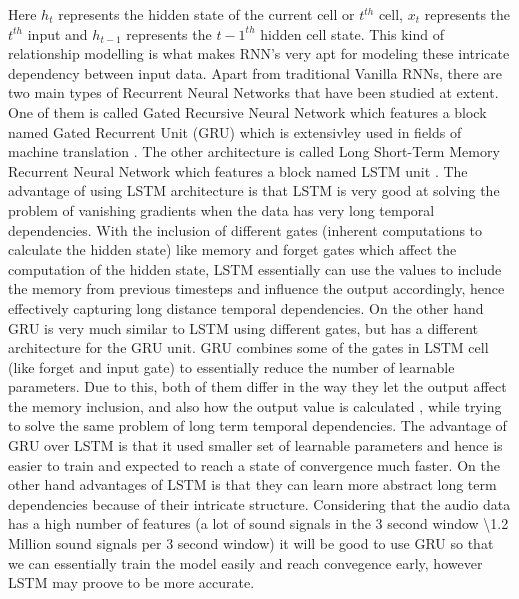 \documentclass[11pt]{article}
\begin{document}
Here $h_t$ represents the hidden state of the current cell or $t^{th}$ cell, $x_t$ represents the $t^{th}$ input and $h_{t-1}$ represents the ${t-1}^{th}$ hidden cell state. This kind of relationship modelling is what makes RNN's very apt for modeling these intricate dependency between input data. Apart from traditional Vanilla RNNs, there are two main types of Recurrent Neural Networks that have been studied at extent. One of them is called Gated Recursive Neural Network which features a block named Gated Recurrent Unit (GRU) which is extensivley used in fields of machine translation \cite{cho2014properties}. The other architecture is called Long Short-Term Memory Recurrent Neural Network which features a block named LSTM unit \cite{graves2013generating}. The advantage of using LSTM architecture is that LSTM is very good at solving the problem of vanishing gradients when the data has very long temporal dependencies. With the inclusion of different gates (inherent computations to calculate the hidden state) like memory and forget gates which affect the computation of the hidden state, LSTM essentially can use the values to include the memory from previous timesteps and influence the output accordingly, hence effectively capturing long distance temporal dependencies. On the other hand GRU is very much similar to LSTM using different gates, but has a different architecture for the GRU unit. GRU combines some of the gates in LSTM cell (like forget and input gate) to essentially reduce the number of learnable parameters. Due to this, both of them differ in the way they let the output affect the memory inclusion, and also how the output value is calculated \cite{chung2014empirical}, while trying to solve the same problem of long term temporal dependencies. The advantage of GRU over LSTM is that it used smaller set of learnable parameters and hence is easier to train and expected to reach a state of convergence much faster. On the other hand advantages of LSTM is that they can learn more abstract long term dependencies because of their intricate structure. Considering that the audio data has a high number of features (a lot of sound signals in the 3 second window \textbackslash 1.2 Million sound signals per 3 second window) it will be good to use GRU so that we can essentially train the model easily and reach convegence early, however LSTM may proove to be more accurate.
\end{document}
